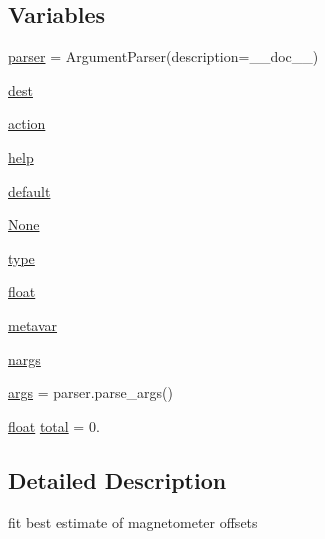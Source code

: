 \subsection*{Variables}
\begin{DoxyCompactItemize}
\item 
\mbox{\hyperlink{namespacepymavlink_1_1tools_1_1magfit__elliptical_a75b9b06fde5d9dd1c5bb5bef2ce48b96}{parser}} = Argument\+Parser(description=\+\_\+\+\_\+doc\+\_\+\+\_\+)
\item 
\mbox{\hyperlink{namespacepymavlink_1_1tools_1_1magfit__elliptical_a8a0619b8f79192239f6078d169563530}{dest}}
\item 
\mbox{\hyperlink{namespacepymavlink_1_1tools_1_1magfit__elliptical_af4aa92b8e9e699beaac25bc75ea83223}{action}}
\item 
\mbox{\hyperlink{namespacepymavlink_1_1tools_1_1magfit__elliptical_a314f9318148b8a5815a70fec0379d438}{help}}
\item 
\mbox{\hyperlink{namespacepymavlink_1_1tools_1_1magfit__elliptical_a6f339a1c3fd61ac7328afce3bb7c39c7}{default}}
\item 
\mbox{\hyperlink{namespacepymavlink_1_1tools_1_1magfit__elliptical_aa362eb699230b51628756d1d7ca8a30e}{None}}
\item 
\mbox{\hyperlink{namespacepymavlink_1_1tools_1_1magfit__elliptical_af208e011e31d230d7f4d4121cae3ac59}{type}}
\item 
\mbox{\hyperlink{namespacepymavlink_1_1tools_1_1magfit__elliptical_a6861d34d9d70f54d30b6530cf1403a66}{float}}
\item 
\mbox{\hyperlink{namespacepymavlink_1_1tools_1_1magfit__elliptical_ace1a7eb5e44ba06cb92630c20408d92d}{metavar}}
\item 
\mbox{\hyperlink{namespacepymavlink_1_1tools_1_1magfit__elliptical_ae35ec6f4f899b1d4c72de9be6f114537}{nargs}}
\item 
\mbox{\hyperlink{namespacepymavlink_1_1tools_1_1magfit__elliptical_a69e14dd920bbdaf1717e57d936df3a31}{args}} = parser.\+parse\+\_\+args()
\item 
\mbox{\hyperlink{namespacepymavlink_1_1tools_1_1magfit__elliptical_a6861d34d9d70f54d30b6530cf1403a66}{float}} \mbox{\hyperlink{namespacepymavlink_1_1tools_1_1magfit__elliptical_ae030b336a8082034bb05fa5688d765d1}{total}} = 0.
\end{DoxyCompactItemize}


\subsection{Detailed Description}
\begin{DoxyVerb}fit best estimate of magnetometer offsets
\end{DoxyVerb}
 

